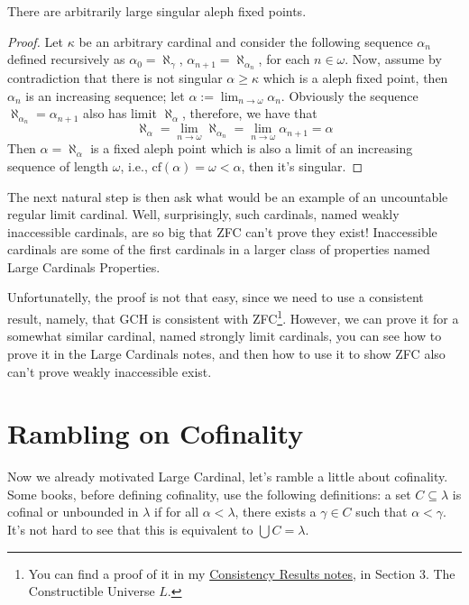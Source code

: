 \begin{lemma}{}{}
    There are arbitrarily large singular aleph fixed points.
\end{lemma}

\begin{proof}
    Let $\kappa$ be an arbitrary cardinal and consider the following sequence $\alpha_n$ defined recursively as $\alpha_0=\aleph_\gamma$, $\alpha_{n+1}=\aleph_{\alpha_n}$, for each $n\in\omega$. Now, assume by contradiction that there is not singular $\alpha\geq\kappa$ which is a aleph fixed point, then $\alpha_n$ is an increasing sequence; let $\alpha:=\lim_{n\to\omega}\alpha_n$. Obviously the sequence $\aleph_{\alpha_n}=\alpha_{n+1}$ also has limit $\aleph_\alpha$, therefore, we have that
    $$\aleph_\alpha=\lim_{n\to\omega}\aleph_{\alpha_n}=\lim_{n\to\omega}\alpha_{n+1}=\alpha$$
    Then $\alpha=\aleph_\alpha$ is a fixed aleph point which is also a limit of an increasing sequence of length $\omega$, i.e., $\text{cf}(\alpha)=\omega<\alpha$, then it's singular.
\end{proof}

The next natural step is then ask what would be an example of an uncountable regular limit cardinal. Well, surprisingly, such cardinals, named weakly inaccessible cardinals, are so big that ZFC can't prove they exist! Inaccessible cardinals are some of the first cardinals in a larger class of properties named Large Cardinals Properties.

Unfortunatelly, the proof is not that easy, since we need to use a consistent result, namely, that GCH is consistent with ZFC\footnote{You can find a proof of it in my \href{https://github.com/Xennonio/Consistency-Results}{Consistency Results notes}, in Section 3. The Constructible Universe $L$.}. However, we can prove it for a somewhat similar cardinal, named strongly limit cardinals, you can see how to prove it in the Large Cardinals notes, and then how to use it to show ZFC also can't prove weakly inaccessible exist.

\section{Rambling on Cofinality}\label{ramb_cof}

Now we already motivated Large Cardinal, let's ramble a little about cofinality. Some books, before defining cofinality, use the following definitions: a set $C\subseteq\lambda$ is cofinal or unbounded in $\lambda$ if for all $\alpha<\lambda$, there exists a $\gamma\in C$ such that $\alpha<\gamma$. It's not hard to see that this is equivalent to $\bigcup C=\lambda$.

